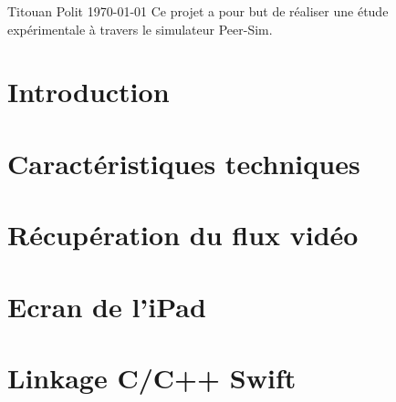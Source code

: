 \documentclass[12pt,a4paper]{article}
\begin{document}
{}
{Titouan Polit}
{}
{\today}
{Ce projet a pour but de réaliser une étude expérimentale à travers le simulateur Peer-Sim.}



\author{Titouan Polit, Louis Falguerolle, Firas Jebari}



% 


\tableofcontents
\vspace*{-0.5cm}

\newpage



\section{Introduction}



\section{Caractéristiques techniques}



\section{Récupération du flux vidéo}


\section{Ecran de l'iPad}



\section{Linkage C/C++ Swift}
\end{document}

